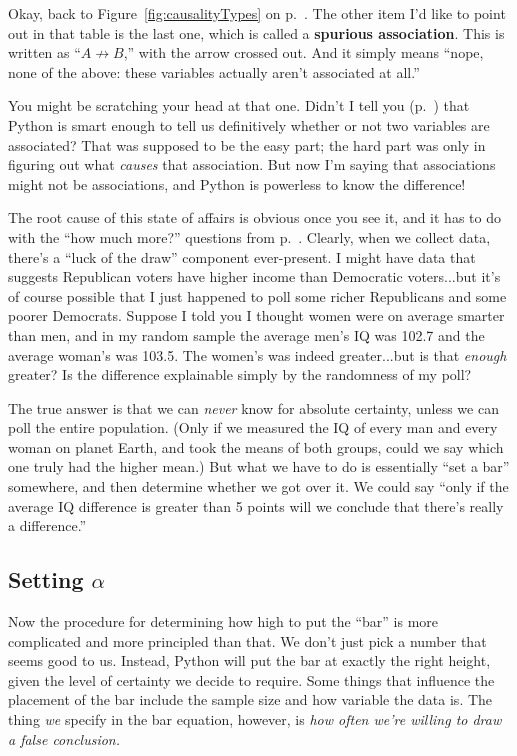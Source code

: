 
Okay, back to Figure~\ref{fig:causalityTypes} on
p.~\pageref{fig:causalityTypes}. The other item I'd like to point out in that
table is the last one, which is called a \textbf{spurious association}. This is
written as ``$A \not\rightarrow B$,'' with the arrow crossed out. And it simply
means ``nope, none of the above: these variables actually aren't associated at
all.''

You might be scratching your head at that one. Didn't I tell you
(p.~\pageref{pythonAssociation}) that Python is smart enough to tell us
definitively whether or not two variables are associated? That was supposed to
be the easy part; the hard part was only in figuring out what \textit{causes}
that association. But now I'm saying that associations might not be
associations, and Python is powerless to know the difference!

The root cause of this state of affairs is obvious once you see it, and it has
to do with the ``how much more?'' questions from p.~\pageref{howMuchMore}.
Clearly, when we collect data, there's a ``luck of the draw'' component
ever-present. I might have data that suggests Republican voters have higher
income than Democratic voters...but it's of course possible that I just
happened to poll some richer Republicans and some poorer Democrats. Suppose I
told you I thought women were on average smarter than men, and in my random
sample the average men's IQ was 102.7 and the average woman's was 103.5. The
women's was indeed greater...but is that \textit{enough} greater? Is the
difference explainable simply by the randomness of my poll?

The true answer is that we can \textit{never} know for absolute certainty,
unless we can poll the entire population. (Only if we measured the IQ of every
man and every woman on planet Earth, and took the means of both groups, could
we say which one truly had the higher mean.) But what we have to do is
essentially ``set a bar'' somewhere, and then determine whether we got over it.
We could say ``only if the average IQ difference is greater than 5 points will
we conclude that there's really a difference.''

\subsection{Setting $\alpha$}

Now the procedure for determining how high to put the ``bar'' is more
complicated and more principled than that. We don't just pick a number that
seems good to us. Instead, Python will put the bar at exactly the right height,
given the level of certainty we decide to require. Some things that influence
the placement of the bar include the sample size and how variable the data is.
The thing \textit{we} specify in the bar equation, however, is \textit{how
often we're willing to draw a false conclusion.}


